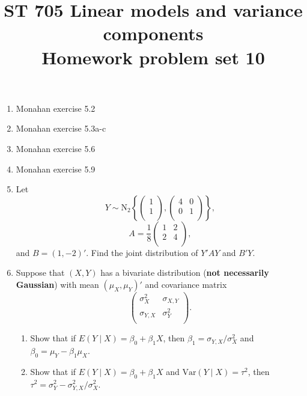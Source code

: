 \documentclass[11pt]{article}
\title{ST 705 Linear models and variance components \\ 
        Homework problem set 10}
\begin{document}
\maketitle

\begin{enumerate}

\item Monahan exercise 5.2

\item Monahan exercise 5.3a-c

\item Monahan exercise 5.6

\item Monahan exercise 5.9

\item Let
\[
Y \sim \text{N}_{2}\left\{
\begin{pmatrix}
1 \\
1 \\
\end{pmatrix},
\begin{pmatrix}
4 & 0 \\
0 & 1 \\
\end{pmatrix}\right\},
\]
\[
A = \frac{1}{8}
\begin{pmatrix}
1 & 2 \\
2 & 4 \\
\end{pmatrix},
\]
and $B = (1, -2)'$.  Find the joint distribution of $Y'AY$ and $B'Y$.

\item Suppose that $(X, Y)$ has a bivariate distribution ({\bf not necessarily Gaussian}) with mean $(\mu_{X}, \mu_{Y})'$ and covariance matrix
\[
\begin{pmatrix}
\sigma_{X}^{2} & \sigma_{X,Y} \\
\sigma_{Y, X} & \sigma_{Y}^{2} \\
\end{pmatrix}.
\]
\begin{enumerate}
\item Show that if $E(Y\mid X) = \beta_{0} + \beta_{1}X$, then $\beta_{1} = \sigma_{Y, X} / \sigma_{X}^{2}$ and $\beta_{0} = \mu_{Y} - \beta_{1}\mu_{X}$.
\item Show that if $E(Y\mid X) = \beta_{0} + \beta_{1}X$ and $\text{Var}(Y\mid X) = \tau^{2}$, then $\tau^{2} = \sigma_{Y}^{2} - \sigma_{Y, X}^{2} / \sigma_{X}^{2}$.
\end{enumerate}

\end{enumerate}
\end{document}
